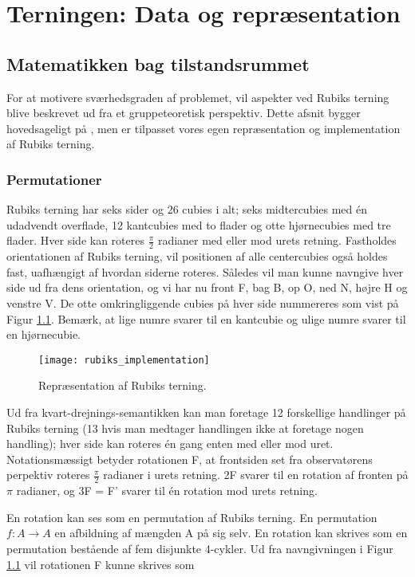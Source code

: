 \documentclass[../main.tex]{subfiles}
\begin{document}
\chapter{Terningen: Data og repræsentation}
\section{Matematikken bag tilstandsrummet}\label{sec:grouptheory}
For at motivere sværhedsgraden af problemet, vil aspekter ved Rubiks terning blive beskrevet ud fra et gruppeteoretisk perspektiv. Dette afsnit bygger hovedsageligt på \cite{GroupTheory}, men er tilpasset vores egen repræsentation og implementation af Rubiks terning. 
\subsection*{Permutationer}

Rubiks terning har seks sider og 26 cubies i alt; seks midtercubies med én udadvendt overflade, 12 kantcubies med to flader og otte hjørnecubies med tre flader. Hver side kan roteres $\frac{\pi}{2}$ radianer med eller mod urets retning. Fastholdes orientationen af Rubiks terning, vil positionen af alle centercubies også holdes fast, uafhængigt af hvordan siderne roteres. Således vil man kunne navngive hver side ud fra dens orientation, og vi har nu front F, bag B, op O, ned N, højre H og venstre V. De otte omkringliggende cubies på hver side nummereres som vist på Figur \ref{RubiksImplementation}. Bemærk, at lige numre svarer til en kantcubie og ulige numre svarer til en hjørnecubie.

\begin{figure}[H]
	\centering 
	\texttt{[image: rubiks\_implementation]}
	\caption{Repræsentation af Rubiks terning.}
	\label{RubiksImplementation}
\end{figure}

Ud fra kvart-drejnings-semantikken kan man foretage 12 forskellige handlinger på Rubiks terning (13 hvis man medtager handlingen ikke at foretage nogen handling); hver side kan roteres én gang enten med eller mod uret. Notationsmæssigt betyder rotationen F, at frontsiden set fra observatørens perpektiv roteres $\frac{\pi}{2}$ radianer i urets retning. 2F svarer til en rotation af fronten på $\pi$ radianer, og 3F = F' svarer til én rotation mod urets retning. 

En rotation kan ses som en permutation af Rubiks terning. En permutation $f:A\rightarrow A$ en afbildning af mængden A på sig selv. En rotation kan skrives som en permutation bestående af fem disjunkte 4-cykler. Ud fra navngivningen i Figur \ref{RubiksImplementation} vil rotationen F kunne skrives som
\end{document}
